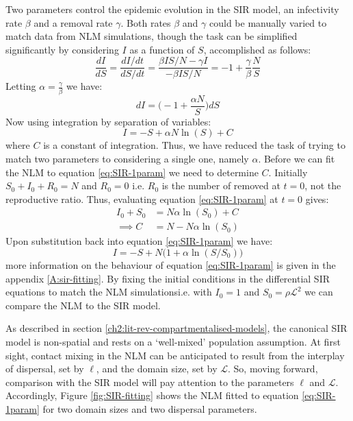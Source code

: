 Two parameters control the epidemic evolution in the SIR model, an infectivity rate $\beta$ and a removal rate $\gamma$. 
Both rates $\beta$ and $\gamma$ could be manually varied to match data from NLM simulations, though the task can be simplified significantly by considering $I$ as a function of $S$, accomplished as follows:
\[
\frac{dI}{dS}=\frac{dI / dt}{dS /dt}= \frac{\beta IS/N - \gamma I}{-\beta IS/N} = -1 + \frac{\gamma}{\beta} \frac{N}{S} \]
Letting $\alpha = \frac{\gamma}{\beta}$ we have:
\[
    dI = \Big(-1 + \frac{\alpha N}{S}\Big)dS
\]
Now using integration by separation of variables:
\begin{equation}
\label{eq:SIR-1param}
     I = -S + \alpha N \ln (S) + C
\end{equation}
where $C$ is a constant of integration. Thus, we have reduced the task of trying to match two parameters to considering a single one, namely $\alpha$. Before we can fit the NLM to equation \ref{eq:SIR-1param} we need to determine $C$. Initially $S_0 + I_0 + R_0= N$ and $R_0=0$ i.e. $R_0$ is the number of removed at $t=0$, not the reproductive ratio. Thus, evaluating equation \ref{eq:SIR-1param} at $t=0$ gives:
\begin{align*}
I_0 + S_0 & = N \alpha\ln (S_0) + C\\ 
 \implies C &= N - N \alpha \ln (S_0) 
\end{align*}
Upon substitution back into equation \ref{eq:SIR-1param} we have:
\begin{equation}
\label{eq:SIR-1param1}
    I = -S + N\big(1 + \alpha \ln (S/S_0)\big)
\end{equation}
more information on the behaviour of equation \ref{eq:SIR-1param} is given in the appendix \ref{A:sir-fitting}.
By fixing the initial conditions in the differential SIR equations to match the NLM simulations\textemdash i.e. with $I_0=1$ and $S_0=\rho \mathcal{L}^2$ \textemdash we can compare the NLM to the SIR model.

As described in section \ref{ch2:lit-rev-compartmentalised-models}, the canonical SIR model is non-spatial and rests on a `well-mixed' population assumption.
At first sight, contact mixing in the NLM can be anticipated to result from the interplay of dispersal, set by $\ell$, and the domain size, set by $\mathcal{L}$.
So, moving forward, comparison with the SIR model will pay attention to the parameters $\ell$ and $\mathcal{L}$. Accordingly, Figure \ref{fig:SIR-fitting} shows the NLM fitted to equation \ref{eq:SIR-1param} for two domain sizes and two dispersal parameters.

